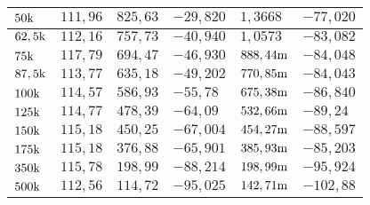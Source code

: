 \begin{table}[H]
\begin{tabular}{ll||l|l||l|l|}
\multicolumn{1}{|l|}{$50\text{k}     $}                & $ 111,96 $  & $ 825,63  $ & $ -29,820 $ & $ 1,3668      $ & $ -77,020  $ \\ \hline
\multicolumn{1}{|l|}{$62,5\text{k}   $}                & $ 112,16 $  & $ 757,73  $ & $ -40,940 $ & $ 1,0573      $ & $ -83,082  $ \\ \hline
\multicolumn{1}{|l|}{$75\text{k}     $}                & $ 117,79 $  & $ 694,47  $ & $ -46,930 $ & $ 888,44\text{m}   $   & $ -84,048  $ \\ \hline
\multicolumn{1}{|l|}{$87,5\text{k}   $}                & $ 113,77 $  & $ 635,18  $ & $ -49,202 $ & $ 770,85\text{m}   $   & $ -84,043  $ \\ \hline
\multicolumn{1}{|l|}{$100\text{k}    $}                & $ 114,57 $  & $ 586,93  $ & $ -55,78  $ & $ 675,38\text{m}   $   & $ -86,840  $ \\ \hline
\multicolumn{1}{|l|}{$125\text{k}    $}                & $ 114,77 $  & $ 478,39  $ & $ -64,09  $ & $ 532,66\text{m}   $   & $ -89,24   $ \\ \hline
\multicolumn{1}{|l|}{$150\text{k}    $}                & $ 115,18 $  & $ 450,25  $ & $ -67,004 $ & $ 454,27\text{m}   $   & $ -88,597  $ \\ \hline
\multicolumn{1}{|l|}{$175\text{k}    $}                & $ 115,18 $  & $ 376,88  $ & $ -65,901 $ & $ 385,93\text{m}   $   & $ -85,203  $ \\ \hline
\multicolumn{1}{|l|}{$350\text{k}    $}                & $ 115,78 $  & $ 198,99  $ & $ -88,214 $ & $ 198,99\text{m}   $   & $ -95,924  $ \\ \hline
\multicolumn{1}{|l|}{$500\text{k}    $}                & $ 112,56 $  & $ 114,72  $ & $ -95,025 $ & $ 142,71\text{m}   $   & $ -102,88  $ \\ \hline
\end{tabular}
\end{table}